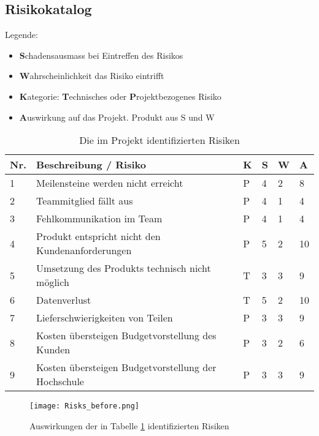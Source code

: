 \newpage

\subsection{Risikokatalog}
\label{sssec:Risikokatalog}
Legende:
\begin{itemize}
	\item \textbf{S}chadensausmass bei Eintreffen des Risikos
	\item \textbf{W}ahrscheinlichkeit das Risiko eintrifft
	\item \textbf{K}ategorie: \textbf{T}echnisches oder \textbf{P}rojektbezogenes Risiko
	\item \textbf{A}uswirkung auf das Projekt. Produkt aus S und W
\end{itemize}

\vspace{1em}
\noindent
\begin{table}[htb]
	\begin{tabularx}{\textwidth}{|l|X|l|l|l||l|}
		\hline
		\textbf{Nr.} & \textbf{Beschreibung / Risiko} & \textbf{K} & \textbf{S} & \textbf{W} & \textbf{A} \\
		\hline
		1 & Meilensteine werden nicht erreicht & P & 4 & 2 & 8 \\
		\hline
		2 & Teammitglied fällt aus & P & 4 & 1 & 4 \\
		\hline
		3 & Fehlkommunikation im Team & P & 4 & 1 & 4 \\
		\hline
		4 & Produkt entspricht nicht den Kundenanforderungen & P & 5 & 2 & 10 \\
		\hline
		5 & Umsetzung des Produkts technisch nicht möglich & T & 3 & 3 & 9 \\
		\hline
		6 & Datenverlust & T & 5 & 2 & 10 \\
		\hline
		7 & Lieferschwierigkeiten von Teilen & P & 3 & 3 & 9 \\
		\hline
		8 & Kosten übersteigen Budgetvorstellung des Kunden & P & 3 & 2 & 6\\
		\hline
		9 & Kosten übersteigen Budgetvorstellung der Hochschule & P & 3 & 3 & 9\\
		\hline
	\end{tabularx}
	\caption{Die im Projekt identifizierten Risiken}
	\label{tbl:Risks}
\end{table}

\vspace{1em}

\begin{figure}[htb]
	\centering
	\texttt{[image: Risks\_before.png]}
	\caption{Auswirkungen der in Tabelle \ref{tbl:Risks} identifizierten Risiken}
\end{figure}

